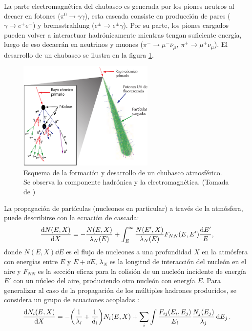 	La parte electromagnética del chubasco es generada por los piones neutros al decaer en fotones ($\pi^0 \rightarrow \gamma \gamma$), esta cascada consiste en producción de pares ($\gamma\rightarrow e^+ e^-$) y bremsstrahlung ($e^{\pm} \rightarrow e^{\pm}\gamma$). Por su parte, los piones cargados pueden volver a interactuar hadrónicamente mientras tengan suficiente energía, luego de eso decaerán en neutrinos y muones ($\pi^{-} \rightarrow \mu^- \bar{\nu}_{\mu}$, $\pi^{+} \rightarrow \mu^+ \nu_{\mu} $). El desarrollo de un chubasco se ilustra en la figura \ref{fig:airshower}.\\
				
	\begin{figure}[h]
	\centering
	\includegraphics[width=0.6\textwidth]{Figuras/air_shower} 
	\caption{Esquema de la formación y desarrollo de un chubasco atmosférico. Se observa la componente hadrónica y la electromagnética. (Tomada de \cite{Poderosas})}
	\label{fig:airshower}
	\end{figure}	
	
	La propagación de partículas (nucleones en particular) a través de la atmósfera, puede describirse con la ecuación de cascada:
	\begin{align}
	\dv{N(E,X)}{X} = -\frac{N(E,X)}{\lambda_N(E)} + \int_E^{\infty}\frac{N(E',X)}{\lambda_N(E)} F_{NN}(E,E') \frac{\dd E'}{E},
	\end{align}
	donde $N(E,X) \dd E$ es el flujo de nucleones a una profundidad $X$ en la atmósfera con energías entre $E$ y $E+\dd E$, $\lambda_N$ es la longitud de interacción del nucleón en el aire y $F_{NN}$ es la sección eficaz para la colisión de un nucleón incidente de energía $E'$ con un núcleo del aire, produciendo otro nucleón con energía $E$. Para generalizar al caso de la propagación de los múltiples hadrones producidos, se considera un grupo de ecuaciones acopladas \cite{Gaisser1990}:
	\begin{align}
	\dv{N_i(E,X)}{X} = -\qty(\frac{1}{\lambda_i}+\frac{1}{d_i}) N_i(E,X) + \sum_i \int \frac{F_{ij}(E_i,E_j)}{E_i} \frac{N_j(E_j)}{\lambda_j} \dd{E_j}.
	\end{align}

